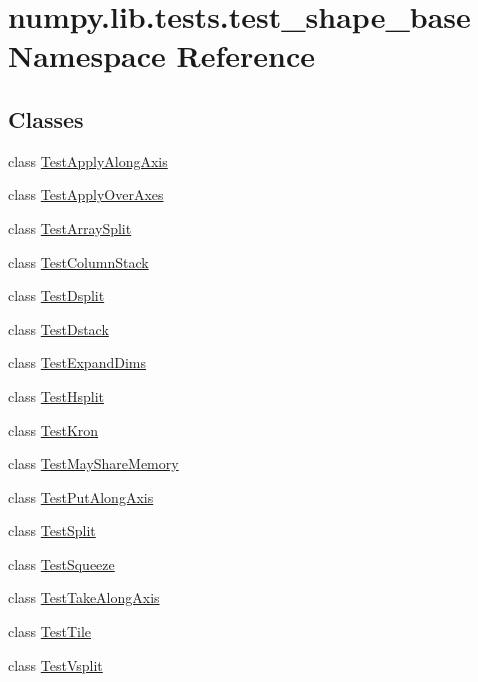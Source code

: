 \hypertarget{namespacenumpy_1_1lib_1_1tests_1_1test__shape__base}{}\section{numpy.\+lib.\+tests.\+test\+\_\+shape\+\_\+base Namespace Reference}
\label{namespacenumpy_1_1lib_1_1tests_1_1test__shape__base}
\subsection*{Classes}
\begin{DoxyCompactItemize}
\item 
class \hyperlink{classnumpy_1_1lib_1_1tests_1_1test__shape__base_1_1TestApplyAlongAxis}{Test\+Apply\+Along\+Axis}
\item 
class \hyperlink{classnumpy_1_1lib_1_1tests_1_1test__shape__base_1_1TestApplyOverAxes}{Test\+Apply\+Over\+Axes}
\item 
class \hyperlink{classnumpy_1_1lib_1_1tests_1_1test__shape__base_1_1TestArraySplit}{Test\+Array\+Split}
\item 
class \hyperlink{classnumpy_1_1lib_1_1tests_1_1test__shape__base_1_1TestColumnStack}{Test\+Column\+Stack}
\item 
class \hyperlink{classnumpy_1_1lib_1_1tests_1_1test__shape__base_1_1TestDsplit}{Test\+Dsplit}
\item 
class \hyperlink{classnumpy_1_1lib_1_1tests_1_1test__shape__base_1_1TestDstack}{Test\+Dstack}
\item 
class \hyperlink{classnumpy_1_1lib_1_1tests_1_1test__shape__base_1_1TestExpandDims}{Test\+Expand\+Dims}
\item 
class \hyperlink{classnumpy_1_1lib_1_1tests_1_1test__shape__base_1_1TestHsplit}{Test\+Hsplit}
\item 
class \hyperlink{classnumpy_1_1lib_1_1tests_1_1test__shape__base_1_1TestKron}{Test\+Kron}
\item 
class \hyperlink{classnumpy_1_1lib_1_1tests_1_1test__shape__base_1_1TestMayShareMemory}{Test\+May\+Share\+Memory}
\item 
class \hyperlink{classnumpy_1_1lib_1_1tests_1_1test__shape__base_1_1TestPutAlongAxis}{Test\+Put\+Along\+Axis}
\item 
class \hyperlink{classnumpy_1_1lib_1_1tests_1_1test__shape__base_1_1TestSplit}{Test\+Split}
\item 
class \hyperlink{classnumpy_1_1lib_1_1tests_1_1test__shape__base_1_1TestSqueeze}{Test\+Squeeze}
\item 
class \hyperlink{classnumpy_1_1lib_1_1tests_1_1test__shape__base_1_1TestTakeAlongAxis}{Test\+Take\+Along\+Axis}
\item 
class \hyperlink{classnumpy_1_1lib_1_1tests_1_1test__shape__base_1_1TestTile}{Test\+Tile}
\item 
class \hyperlink{classnumpy_1_1lib_1_1tests_1_1test__shape__base_1_1TestVsplit}{Test\+Vsplit}
\end{DoxyCompactItemize}
